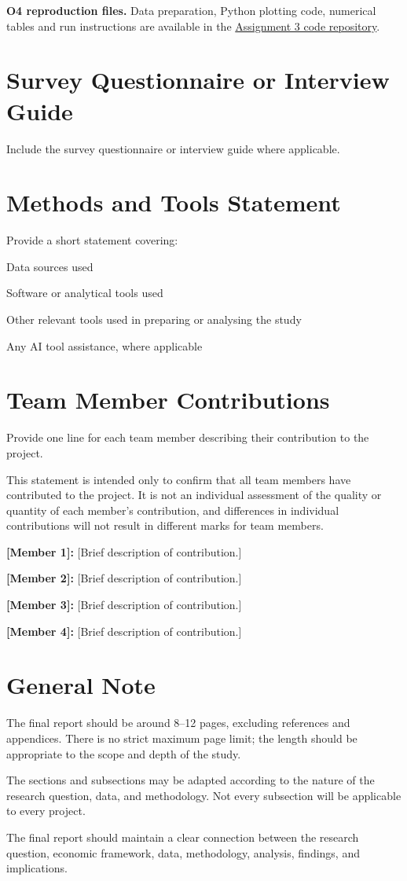 \documentclass[12pt,a4paper]{article}
\newcommand{\templatebullet}[1]{\par\noindent\textbullet\hspace{5.88pt}#1\par}
\begin{document}
\textbf{O4 reproduction files.} Data preparation, Python plotting code, numerical tables and run instructions are available in the \href{https://github.com/Goutham7358/Assignment3_Code}{Assignment 3 code repository}.

\section{Survey Questionnaire or Interview Guide}
Include the survey questionnaire or interview guide where applicable.

\newpage
\section*{Methods and Tools Statement}
Provide a short statement covering:
\templatebullet{Data sources used}
\templatebullet{Software or analytical tools used}
\templatebullet{Other relevant tools used in preparing or analysing the study}
\templatebullet{Any AI tool assistance, where applicable}

\section*{Team Member Contributions}
Provide one line for each team member describing their contribution to the project.

This statement is intended only to confirm that all team members have contributed to the project. It is not an individual assessment of the quality or quantity of each member's contribution, and differences in individual contributions will not result in different marks for team members.
\templatebullet{\textbf{[Member 1]:} [Brief description of contribution.]}
\templatebullet{\textbf{[Member 2]:} [Brief description of contribution.]}
\templatebullet{\textbf{[Member 3]:} [Brief description of contribution.]}
\templatebullet{\textbf{[Member 4]:} [Brief description of contribution.]}

\newpage
\section*{General Note}
The final report should be around 8--12 pages, excluding references and appendices. There is no strict maximum page limit; the length should be appropriate to the scope and depth of the study.

The sections and subsections may be adapted according to the nature of the research question, data, and methodology. Not every subsection will be applicable to every project.

The final report should maintain a clear connection between the research question, economic framework, data, methodology, analysis, findings, and implications.
\end{document}
